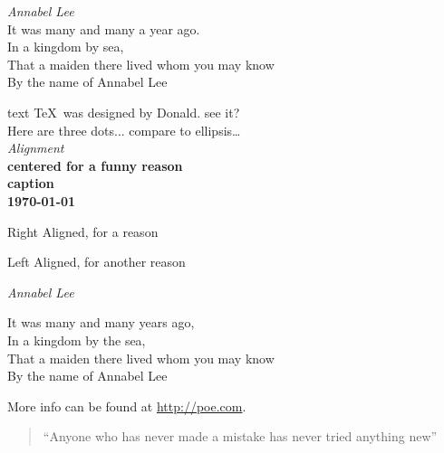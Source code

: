 \documentclass{article}
\begin{document}
\emph{Annabel Lee}\\
It was many and many a year ago.\\[2mm]
In a kingdom by sea,\\
That a maiden there lived whom you may know\\
By the name of Annabel Lee

\mbox{text} 
\TeX\ was designed by Donald\@. see it? \\
Here are three dots... compare to ellipsis\ldots \\[2cm]

\emph{Alignment}\\

{\centering
\huge\bfseries centered for a funny reason\\
\large\normalfont caption\\
\normalsize\today\\
}

\parbox{2cm}{\raggedright
    Right Aligned, for a reason}
\parbox{2cm}{\raggedleft
    Left Aligned, for another reason}

\begin{center}
    \emph{Annabel Lee}
\end{center}
\begin{center}
    It was many and many years ago,\\
    In a kingdom by the sea,\\
    That a maiden there lived whom you may know\\
    By the name of Annabel Lee
\end{center}
More info can be found at
\url{http://poe.com}.

\begin{quote}
``Anyone who has never made a mistake has never tried anything new''
\end{quote}
\end{document}
